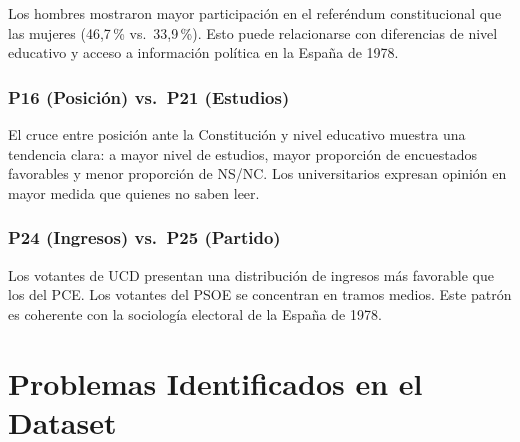 \documentclass[12pt,a4paper]{article}
\begin{document}
Los hombres mostraron mayor participación en el referéndum constitucional que las mujeres (46,7\,\% vs.\ 33,9\,\%). Esto puede relacionarse con diferencias de nivel educativo y acceso a información política en la España de 1978.

\subsubsection{P16 (Posición) vs.\ P21 (Estudios)}

El cruce entre posición ante la Constitución y nivel educativo muestra una tendencia clara: a mayor nivel de estudios, mayor proporción de encuestados favorables y menor proporción de NS/NC. Los universitarios expresan opinión en mayor medida que quienes no saben leer.

\subsubsection{P24 (Ingresos) vs.\ P25 (Partido)}

Los votantes de UCD presentan una distribución de ingresos más favorable que los del PCE. Los votantes del PSOE se concentran en tramos medios. Este patrón es coherente con la sociología electoral de la España de 1978.

\newpage

\section{Problemas Identificados en el Dataset}
\end{document}
